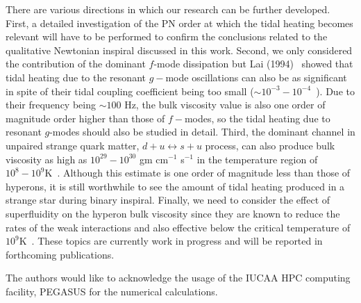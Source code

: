 \documentclass[%
 reprint,
 amsmath,amssymb,
 aps,
]{revtex4-2}
\begin{document}
There are various directions in which our research can be further developed. First, a detailed investigation of the PN order at which the tidal heating becomes relevant will have to be performed to confirm the conclusions related to the qualitative Newtonian inspiral discussed in this work. Second, we only considered the contribution of the dominant $f$-mode dissipation but Lai (1994)~\cite{Lai_1994} showed that tidal heating due to the resonant $g-$mode oscillations can also be as significant in spite of their tidal coupling coefficient being too small ($\sim 10^{-3}-10^{-4}$~\cite{Andersson_2018}). Due to their frequency being $\sim 100$ Hz, the bulk viscosity value is also one order of magnitude order higher than those of $f-$modes, so the tidal heating due to resonant $g$-modes should also be studied in detail. Third, the dominant channel in unpaired strange quark matter, $d + u \longleftrightarrow s + u$ process, can also produce bulk viscosity as high as $10^{29}-10^{30}$ gm cm$^{-1}$ s$^{-1}$ in the temperature region of $10^8-10^9$K~\cite{Alford_2010,Alford_2014}. Although this estimate is one order of magnitude less than those of hyperons, it is still worthwhile to see the amount of tidal heating produced in a strange star during binary inspiral. Finally, we need to consider the effect of superfluidity on the hyperon bulk viscosity since they are known to reduce the rates of the weak interactions and also effective below the critical temperature of $10^9$K~\cite{Haskell2010}. These topics are currently work in progress and will be reported in forthcoming publications. \\


\begin{acknowledgments}
 The authors would like to acknowledge the usage of the IUCAA HPC computing facility, PEGASUS for the numerical calculations. 
\end{acknowledgments}



\nocite{*}

\end{document}
